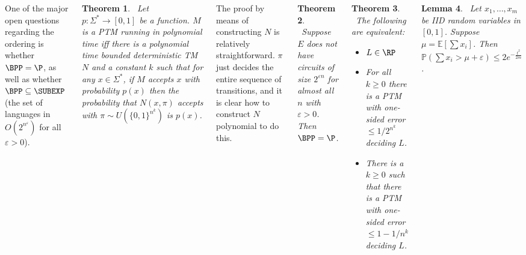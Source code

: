 \documentclass{tikzposter} %
\newtheorem{theorem}{Theorem}
\newtheorem{lemma}[theorem]{Lemma}
\begin{document}
\begin{columns}
{  One of the major open questions regarding the ordering is whether $\BPP = \P$, as well as whether $\BPP \subseteq \SUBEXP$ (the set of languages in $O(2^{n^{\varepsilon}})$ for all $\varepsilon >0$). \\

  \begin{theorem}
  \ Let $p : \Sigma^{*} \to [0,1]$ be a function. $M$ is a PTM running in polynomial time iff there is a polynomial time bounded deterministic TM $N$ and a constant $k$ such that for any $x \in \Sigma^{*}$, if $M$ accepts $x$ with probability $p(x)$ then the probability that $N(x,\pi)$ accepts with $\pi \sim U(\{0,1\}^{n^{k}})$ is $p(x)$.
  \end{theorem}
  \hphantom{}

  The proof by means of constructing $N$ is relatively straightforward. $\pi$ just decides the entire sequence of transitions, and it is clear how to construct $N$ polynomial to do this. \\

  \begin{theorem}
  \ Suppose $E$ does not have circuits of size $2^{\varepsilon n}$ for almost all $n$ with $\varepsilon > 0$. Then $\BPP = \P$.
  \end{theorem}

  \begin{theorem}
    \ The following are equivalent:
    \begin{itemize}
    \item $L \in \RP$
    \item For all $k \ge 0$ there is a PTM with one-sided error $\le 1/2^{n^{k}}$ deciding $L$.
    \item There is a $k \ge 0$ such that there is a PTM with one-sided error $\le 1-1/n^{k}$ deciding $L$.
    \end{itemize}
  \end{theorem}
  \hphantom{}

  \begin{lemma}
  \ Let $x_{1},\dots,x_{m}$ be IID random variables in $[0,1]$. Suppose $\mu = \mathbb{E}[\sum x_{i}]$. Then $\mathbb{P}(\sum x_{i} > \mu + \varepsilon) \le 2e^{-\frac{t^{2}}{2m}}$.
  \end{lemma}
}
\end{columns}
\end{document}
